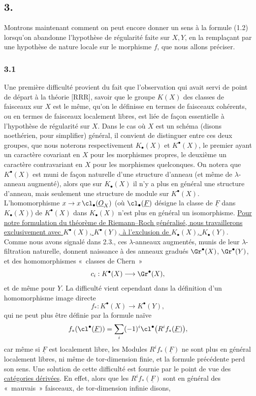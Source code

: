 \subsection*{3.}
Montrons maintenant comment on peut encore donner un sens à la formule (1.2) lorsqu'on abandonne l'hypothèse de régularité faite sur $X,Y$, en la remplaçant par une hypothèse de nature locale sur le morphisme $f$, que nous allons préciser.

\subsubsection*{3.1}
Une première difficulté provient du fait que l'observation qui avait servi de point de départ à la théorie [RRR], savoir que le groupe $K(X)$ des classes de faisceaux sur $X$ est le même, qu'on le définisse en termes de faisceaux cohérents, ou en termes de faisceaux localement libres, est liée de façon essentielle à l'hypothèse de régularité sur $X$. Dans le cas où $X$ est un schéma (disons noethérien, pour simplifier) général, il convient de distinguer entre ces deux groupes, que nous noterons respectivement $K_\bullet(X)$ et $K^\bullet(X)$, le premier ayant un caractère covariant en $X$ pour les morphismes propres, le deuxième un caractère contravariant en $X$ pour les morphismes quelconques. On notera que $K^\bullet(X)$ est muni de façon naturelle d'une structure d'anneau (et même de $\lambda$-anneau augmenté), alors que sur $K_\bullet(X)$ il n'y a plus en général une structure d'anneau, mais seulement une structure de module sur $K^\bullet(X)$. L'homomorphisme $x\to x\,\cl_\bullet(\underline O_X)$ (où $\cl_\bullet(\underline F)$ désigne la classe de $\underline F$ dans $K_\bullet(X)$) de $K^\bullet(X)$ dans $K_\bullet(X)$ n'est plus en général un isomorphisme. \uline{Pour notre formulation du théorème de Riemann--Roch généralisé, nous travaillerons exclusivement avec $K^\bullet(X)$, $K^\bullet(Y)$, à l'exclusion de $K_\bullet(X)$, $K_\bullet(Y)$}. Comme nous avons signalé dans 2.3., ces $\lambda$-anneaux augmentés, munis de leur $\lambda$-filtration naturelle, donnent naissance à des anneaux gradués $\Gr^\bullet(X)$, $\Gr^\bullet(Y)$, et des homomorphismes «~classes de Chern~»
\[
c_i:K^\bullet(X)\longrightarrow \Gr^\bullet(X),
\]
et de même pour $Y$. La difficulté vient cependant dans la définition d'un homomorphisme image directe
\begin{equation}\tag{3.1}
f_*:K^\bullet(X)\longrightarrow K^\bullet(Y),
\end{equation}
qui ne peut plus être définie par la formule naïve
\[
f_*(\cl^\bullet(\underline F))=\sum_i(-1)^i\cl^\bullet\bigl(R^if_*(\underline F)\bigr),
\]
car même si $\underline F$ est localement libre, les Modules $R^if_*(\underline F)$ ne sont plus en général localement libres, ni même de tor-dimension finie, et la formule précédente perd son sens. Une solution de cette difficulté est fournie par le point de vue des \underline{catégories dérivées}. En effet, alors que les $R^if_*(\underline F)$ sont en général des «~mauvais~» faisceaux, de tor-dimension infinie disons,
